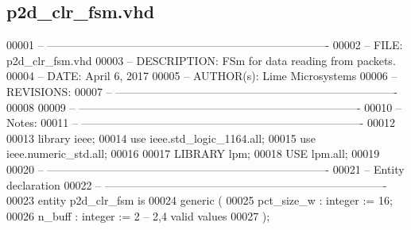 \subsection{p2d\+\_\+clr\+\_\+fsm.\+vhd}
\label{p2d__clr__fsm_8vhd_source}

\begin{DoxyCode}
00001 \textcolor{keyword}{-- ---------------------------------------------------------------------------- }
00002 \textcolor{keyword}{-- FILE:    p2d\_clr\_fsm.vhd}
00003 \textcolor{keyword}{-- DESCRIPTION: FSm for data reading from packets.}
00004 \textcolor{keyword}{-- DATE:    April 6, 2017}
00005 \textcolor{keyword}{-- AUTHOR(s):   Lime Microsystems}
00006 \textcolor{keyword}{-- REVISIONS:}
00007 \textcolor{keyword}{-- ---------------------------------------------------------------------------- }
00008 
00009 \textcolor{keyword}{-- ----------------------------------------------------------------------------}
00010 \textcolor{keyword}{-- Notes:}
00011 \textcolor{keyword}{-- ----------------------------------------------------------------------------}
00012 
00013 \textcolor{vhdlkeyword}{library }\textcolor{keywordflow}{ieee};
00014 \textcolor{vhdlkeyword}{use }ieee.std\_logic\_1164.\textcolor{keywordflow}{all};
00015 \textcolor{vhdlkeyword}{use }ieee.numeric\_std.\textcolor{keywordflow}{all};
00016 
00017 \textcolor{vhdlkeyword}{LIBRARY }\textcolor{keywordflow}{lpm};
00018 \textcolor{vhdlkeyword}{USE }\textcolor{keywordflow}{lpm.all};
00019 
00020 \textcolor{keyword}{-- ----------------------------------------------------------------------------}
00021 \textcolor{keyword}{-- Entity declaration}
00022 \textcolor{keyword}{-- ----------------------------------------------------------------------------}
00023 \textcolor{keywordflow}{entity }p2d_clr_fsm \textcolor{keywordflow}{is}
00024    \textcolor{keywordflow}{generic} \textcolor{vhdlchar}{(}
00025       \textcolor{vhdlchar}{pct_size_w}           \textcolor{vhdlchar}{:} \textcolor{comment}{integer} \textcolor{vhdlchar}{:=} \textcolor{vhdllogic}{}\textcolor{vhdllogic}{16};
00026       \textcolor{vhdlchar}{n_buff}               \textcolor{vhdlchar}{:} \textcolor{comment}{integer} \textcolor{vhdlchar}{:=} \textcolor{vhdllogic}{}\textcolor{vhdllogic}{2}\textcolor{keyword}{ -- 2,4 valid values}
00027    \textcolor{vhdlchar}{)};

\end{DoxyCode}
